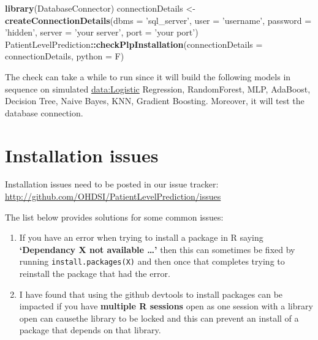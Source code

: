 \documentclass[
]{article}
\newenvironment{Shaded}{\begin{snugshade}}{\end{snugshade}}
\newcommand{\DataTypeTok}[1]{\textcolor[rgb]{0.13,0.29,0.53}{#1}}
\newcommand{\KeywordTok}[1]{\textcolor[rgb]{0.13,0.29,0.53}{\textbf{#1}}}
\newcommand{\NormalTok}[1]{#1}
\newcommand{\OperatorTok}[1]{\textcolor[rgb]{0.81,0.36,0.00}{\textbf{#1}}}
\newcommand{\StringTok}[1]{\textcolor[rgb]{0.31,0.60,0.02}{#1}}
\begin{document}
\begin{Shaded}
\begin{Highlighting}[]
\KeywordTok{library}\NormalTok{(DatabaseConnector)}
\NormalTok{connectionDetails <-}\StringTok{ }\KeywordTok{createConnectionDetails}\NormalTok{(}\DataTypeTok{dbms =} \StringTok{'sql_server'}\NormalTok{, }
                                           \DataTypeTok{user =} \StringTok{'username'}\NormalTok{, }
                                           \DataTypeTok{password =} \StringTok{'hidden'}\NormalTok{, }
                                           \DataTypeTok{server =} \StringTok{'your server'}\NormalTok{, }
                                           \DataTypeTok{port =} \StringTok{'your port'}\NormalTok{)}
\NormalTok{PatientLevelPrediction}\OperatorTok{::}\KeywordTok{checkPlpInstallation}\NormalTok{(}\DataTypeTok{connectionDetails =}\NormalTok{ connectionDetails, }
                                             \DataTypeTok{python =}\NormalTok{ F)}
\end{Highlighting}
\end{Shaded}

The check can take a while to run since it will build the following
models in sequence on simulated \url{data:Logistic} Regression,
RandomForest, MLP, AdaBoost, Decision Tree, Naive Bayes, KNN, Gradient
Boosting. Moreover, it will test the database connection.

\hypertarget{installation-issues}{%
\section{Installation issues}\label{installation-issues}}

Installation issues need to be posted in our issue tracker:
\url{http://github.com/OHDSI/PatientLevelPrediction/issues}

The list below provides solutions for some common issues:

\begin{enumerate}
\def\labelenumi{\arabic{enumi}.}
\item
  If you have an error when trying to install a package in R saying
  \textbf{`Dependancy X not available \ldots{}'} then this can sometimes
  be fixed by running
  \texttt{install.packages(\textquotesingle{}X\textquotesingle{})} and
  then once that completes trying to reinstall the package that had the
  error.
\item
  I have found that using the github devtools to install packages can be
  impacted if you have \textbf{multiple R sessions} open as one session
  with a library open can causethe library to be locked and this can
  prevent an install of a package that depends on that library.
\end{enumerate}
\end{document}

